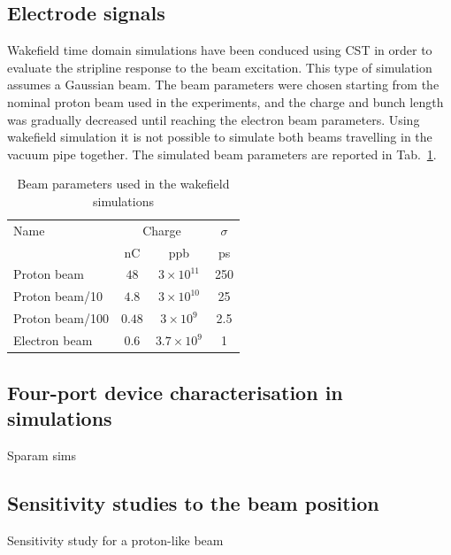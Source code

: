 \subsection[Electrode signals]{Electrode signals}

Wakefield time domain simulations have been conduced using CST in order to evaluate the stripline response to the beam excitation. This type of simulation assumes a Gaussian beam. The beam parameters were chosen starting from the nominal proton beam used in the experiments, and the charge and bunch length was gradually decreased until reaching the electron beam parameters. Using wakefield simulation it is not possible to simulate both beams travelling in the vacuum pipe together. The simulated beam parameters are reported in Tab.~\ref{beam_param_wak:tab}.

\begin{table}
  \centering
    \begin{tabular}{l c c c}
    \toprule
    Name  & \multicolumn{2}{c}{Charge} & $\sigma$\\
          & nC & ppb & ps\\
    \midrule
    Proton beam								& $48$	  & $3\times10^{11}$	& 250	\\
    Proton beam/10						& $4.8$	  & $3\times10^{10}$	& 25	\\
    Proton beam/100						& $0.48$  & $3\times10^{9}$		& 2.5	\\
    Electron beam							& $0.6$	  & $3.7\times10^{9}$	& 1		\\
    \bottomrule
    \end{tabular}
  \caption{Beam parameters used in the wakefield simulations} \label{beam_param_wak:tab}
\end{table}




\subsection[Four-port device characterisation in simulations]{Four-port device characterisation in simulations}

Sparam sims

\subsection[Sensitivity studies to the beam position]{Sensitivity studies to the beam position}

Sensitivity study for a proton-like beam




